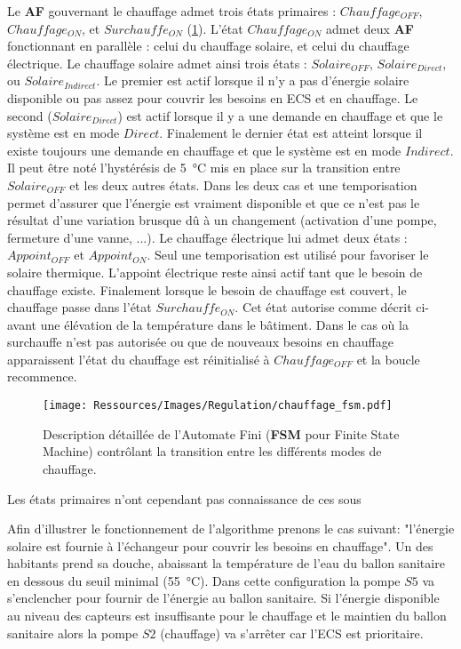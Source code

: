 Le \textbf{AF} gouvernant le chauffage admet trois états primaires : $Chauffage_{OFF}$,
$Chauffage_{ON}$, et $Surchauffe_{ON}$ (\ref{fig:automate_chauffage}). L’état
$Chauffage_{ON}$ admet deux \textbf{AF} fonctionnant en parallèle : celui du chauffage
solaire, et celui du chauffage électrique. Le chauffage solaire admet ainsi trois états :
$Solaire_{OFF}$, $Solaire_{Direct}$, ou $Solaire_{Indirect}$. Le premier est actif
lorsque il n’y a pas d’énergie solaire disponible ou pas assez pour couvrir les besoins
en ECS et en chauffage. Le second ($Solaire_{Direct}$) est actif lorsque il y a une demande
en chauffage et que le système est en mode $Direct$. Finalement le dernier état est
atteint lorsque il existe toujours une demande en chauffage et que le système est en
mode $Indirect$.
Il peut être noté l’hystérésis de \SI{5}{\celsius} mis en place sur la transition entre $Solaire_{OFF}$
et les deux autres états. Dans les deux cas et une temporisation permet d’assurer que
l’énergie est vraiment disponible et que ce n’est pas le résultat d’une variation
brusque dû à un changement (activation d’une pompe, fermeture d’une vanne, ...).
Le chauffage électrique lui admet deux états : $Appoint_{OFF}$ et $Appoint_{ON}$.
Seul une temporisation est utilisé pour favoriser le solaire thermique. L’appoint
électrique reste ainsi actif tant que le besoin de chauffage existe. Finalement
lorsque le besoin de chauffage est couvert, le chauffage passe dans l’état $Surchauffe_{ON}$.
Cet état autorise comme décrit ci-avant une élévation de la température dans le bâtiment.
Dans le cas où la surchauffe n’est pas autorisée ou que de nouveaux besoins en
chauffage apparaissent l’état du chauffage est réinitialisé à $Chauffage_{OFF}$ et
la boucle recommence.


\begin{figure}
    \begin{center}
        \texttt{[image: Ressources/Images/Regulation/chauffage\_fsm.pdf]}
    \end{center}
    \caption{Description détaillée de l’Automate Fini (\textbf{FSM} pour Finite State Machine)
             contrôlant la transition entre les différents modes de chauffage.
             \label{fig:automate_chauffage}}
\end{figure}

Les états primaires n’ont
cependant pas connaissance de ces sous


Afin d’illustrer le fonctionnement de l’algorithme prenons le cas suivant: "l’énergie
solaire est fournie à l’échangeur pour couvrir les besoins en chauffage". Un des habitants
prend sa douche, abaissant la température de l’eau du ballon sanitaire en dessous du seuil
minimal (\SI{55}{\celsius}). Dans cette configuration la pompe $S5$ va s’enclencher pour
fournir de l’énergie au ballon sanitaire. Si l’énergie disponible au niveau des capteurs
est insuffisante pour le chauffage et le maintien du ballon sanitaire alors la pompe $S2$
(chauffage) va s’arrêter car l’ECS est prioritaire.


